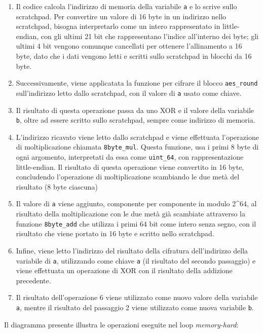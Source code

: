 \begin{enumerate}
\def\labelenumi{\arabic{enumi}.}
\item
  Il codice calcola l'indirizzo di memoria della variabile \texttt{a} e
  lo scrive sullo scratchpad. Per convertire un valore di 16 byte in un
  indirizzo nello scratchpad, bisogna interpretarlo come un intero
  rappresentato in little-endian, con gli ultimi 21 bit che
  rappresentano l'indice all'interno dei byte; gli ultimi 4 bit vengono
  comunque cancellati per ottenere l'allinamento a 16 byte, dato che i
  dati vengono letti e scritti sullo scratchpad in blocchi da 16 byte.
\item
  Successivamente, viene applicatata la funzione per cifrare il blocco
  \texttt{aes\_round} sull'indirizzo letto dallo scratchpad, con il
  valore di \texttt{a} usato come chiave.
\item
  Il risultato di questa operazione passa da uno XOR e il valore della
  variabile \texttt{b}, oltre ad essere scritto sullo scratchpad, sempre
  come indirizzo di memoria.
\item
  L'indirizzo ricavato viene letto dallo scratchpad e viene effettuata
  l'operazione di moltiplicazione chiamata \texttt{8byte\_mul}. Questa
  funzione, usa i primi 8 byte di ogni argomento, interpretati da essa
  come \texttt{uint\_64}, con rappresentazione little-endian. Il
  risultato di questa operazione viene convertito in 16 byte,
  concludendo l'operazione di moltiplicazione scambiando le due metà del
  risultato (8 byte ciascuna)
\item
  Il valore di \texttt{a} viene aggiunto, componente per componente in
  modulo 2\^{}64, al risultato della moltiplicazione con le due metà già
  scambiate attraverso la funzione \texttt{8byte\_add} che utilizza i
  primi 64 bit come intero senza segno, con il risultato che viene
  portato in 16 byte e scritto nello scratchpad.
\item
  Infine, viene letto l'indirizzo del risultato della cifratura
  dell'indirizzo della variabile di \texttt{a}, utilizzando come chiave
  \texttt{a} (il risultato del secondo passaggio) e viene effettuata un
  operazione di XOR con il risultato della addizione precedente.
\item
  Il risultato dell'operazione 6 viene utilizzato come nuovo valore
  della variabile \texttt{a}, mentre il risultato del passaggio 2 viene
  utilizzato come nuova variabile \texttt{b}.
\end{enumerate}

Il diagramma presente illustra le operazioni eseguite nel loop
\emph{memory-hard}:

